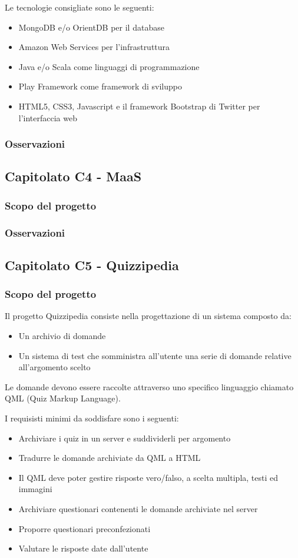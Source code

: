 Le tecnologie consigliate sono le seguenti:
\begin{itemize}
	\item MongoDB e/o OrientDB per il database
	\item Amazon Web Services per l'infrastruttura
	\item Java e/o Scala come linguaggi di programmazione
	\item Play Framework come framework di sviluppo
	\item HTML5, CSS3, Javascript e il framework Bootstrap di Twitter per l'interfaccia web
\end{itemize}

\subsubsection{Osservazioni}

\subsection{Capitolato C4 - MaaS}
\subsubsection{Scopo del progetto}

\subsubsection{Osservazioni}


\subsection{Capitolato C5 - Quizzipedia}
\subsubsection{Scopo del progetto}

Il progetto Quizzipedia consiste nella progettazione di un sistema composto da:
\begin{itemize}
	\item Un archivio di domande
	\item Un sistema di test che somministra all'utente una serie di domande relative all'argomento scelto
\end{itemize}
Le domande devono essere raccolte attraverso uno specifico linguaggio chiamato QML (Quiz Markup Language).

I requisisti minimi da soddisfare sono i seguenti:
\begin{itemize}
	\item Archiviare i quiz in un server e suddividerli per argomento
	\item Tradurre le domande archiviate da QML a HTML
	\item Il QML deve poter gestire risposte vero/falso, a scelta multipla, testi ed immagini
	\item Archiviare questionari contenenti le domande archiviate nel server
	\item Proporre questionari preconfezionati
	\item Valutare le risposte date dall'utente
\end{itemize}

